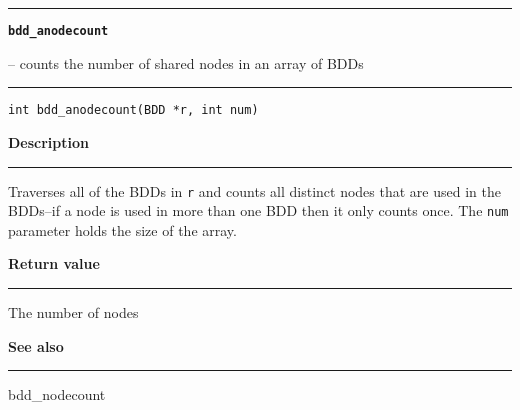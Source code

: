 \begin{minipage}{\textwidth}

\noindent\begin{minipage}{\textwidth}
\rule{\textwidth}{0.5mm}
{\tt\bf bdd\_anodecount }
\--- counts the number of shared nodes in an array of BDDs  \hspace{\fill}
\\\rule[1.5ex]{\textwidth}{0.5mm}
\end{minipage}

\noindent\begin{verbatim}
int bdd_anodecount(BDD *r, int num) 
\end{verbatim}

\vspace{\parsep}\noindent
{\bf Description}\\\rule[1.5ex]{\textwidth}{0.2mm}\vspace{-1.5ex}\setlength{\parindent}{1em}
Traverses all of the BDDs in {\tt r} and counts all distinct nodes
           that are used in the BDDs--if a node is used in more than one
	   BDD then it only counts once. The {\tt num} parameter holds the
	   size of the array. 

\setlength{\parindent}{0em}\vspace{\parsep}\vspace{\baselineskip}\noindent
{\bf Return value}\\\rule[1.5ex]{\textwidth}{0.2mm}\vspace{-1.5ex}
The number of nodes 

\vspace{\parsep}\vspace{\baselineskip}\noindent
{\bf See also}\\\rule[1.5ex]{\textwidth}{0.2mm}\vspace{-1.5ex}
bdd\_nodecount 
\end{minipage}
\vspace{8ex}
